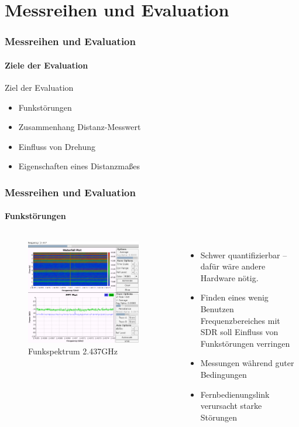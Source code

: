 \documentclass{beamer}
\begin{document}
\section{Messreihen und Evaluation}
\begin{frame}
	\frametitle{Messreihen und Evaluation}
	\framesubtitle{Ziele der Evaluation}
	Ziel der Evaluation
	\begin{itemize}
		\item Funkstörungen
		\item Zusammenhang Distanz-Messwert
		\item Einfluss von Drehung
		\item Eigenschaften eines Distanzmaßes
	\end{itemize}

\end{frame}

\begin{frame}
	\frametitle{Messreihen und Evaluation}
	\framesubtitle{Funkstörungen}

	\begin{columns}

		\begin{figure}
			\centering
			\includegraphics[width=0.9\textwidth]{img/ch6.png}
			\caption{Funkspektrum 2.437GHz}
		\end{figure}
		\begin{itemize}
			\item Schwer quantifizierbar – dafür wäre andere Hardware nötig.
			\item Finden eines wenig Benutzen Frequenzbereiches mit SDR soll Einfluss von Funkstörungen verringen
			\item Messungen während guter Bedingungen
			\item Fernbedienungslink verursacht starke Störungen
		\end{itemize}
	\end{columns}	
\end{frame}
\end{document}
